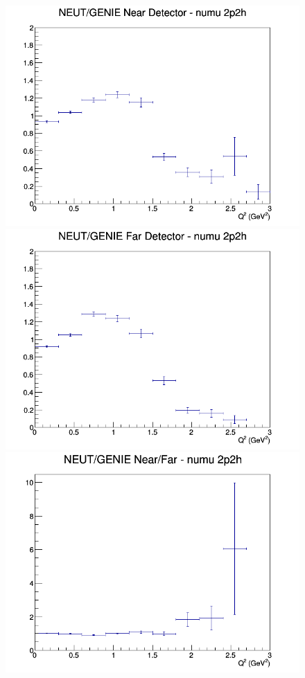 \documentclass[12pt]{article}
\begin{document}
\begin{figure}[h]
\endminipage
\newline
{}
\includegraphics[width=\linewidth]{eff_Q2/GAr/ratios/2p2h_NEUT_GENIE_numu_near_Q2.png}
\endminipage
{}
\includegraphics[width=\linewidth]{eff_Q2/GAr/ratios/2p2h_NEUT_GENIE_numu_far_Q2.png}
\endminipage
{}
\includegraphics[width=\linewidth]{eff_Q2/GAr/ratios/2p2h_NEUT_GENIE_numu_NF_Q2.png}

\end{figure}
\end{document}
